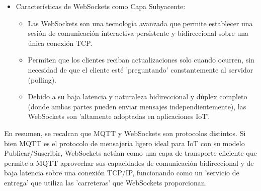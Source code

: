 \documentclass{report}
\begin{document}
\begin{itemize}
\begin{itemize}
        \end{itemize}
    \item Características de WebSockets como Capa Subyacente:
        \begin{itemize}
            \item Las WebSockets son una tecnología avanzada que permite establecer una sesión de comunicación interactiva 
            persistente y bidireccional sobre una única conexión TCP.
            \item Permiten que los clientes reciban actualizaciones solo cuando ocurren, sin necesidad de que el cliente esté 
            'preguntando' constantemente al servidor (polling).
            \item Debido a su baja latencia y naturaleza bidireccional y dúplex completo (donde ambas partes pueden enviar mensajes 
            independientemente), las WebSockets son 'altamente adoptadas en aplicaciones IoT'.
        \end{itemize}
\end{itemize}
En resumen, se  recalcan que MQTT y WebSockets son protocolos distintos. Si bien MQTT es el protocolo de mensajería ligero 
ideal para IoT con su modelo Publicar/Suscribir, WebSockets actúan como una capa de transporte eficiente que permite a MQTT aprovechar 
sus capacidades de comunicación bidireccional y de baja latencia sobre una conexión TCP/IP, funcionando como un 
'servicio de entrega' que utiliza las 'carreteras' que WebSockets proporcionan.
\end{document}

